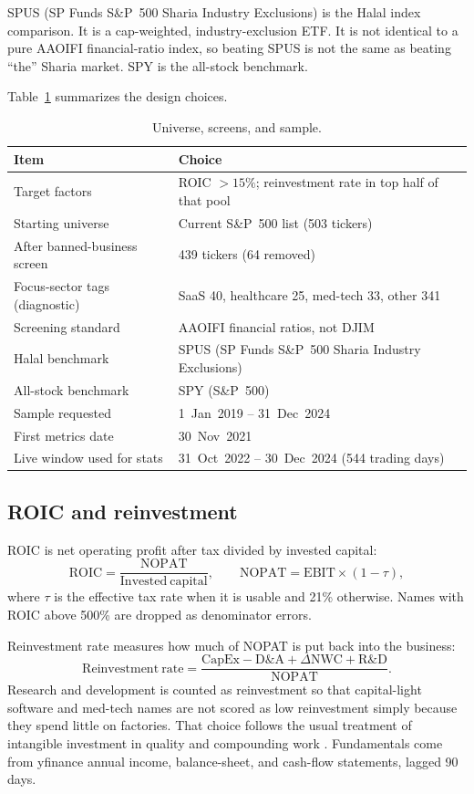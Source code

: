\documentclass[11pt,letterpaper]{article}
\begin{document}
SPUS (SP Funds S\&P~500 Sharia Industry Exclusions) is the Halal index comparison. It is a cap-weighted, industry-exclusion ETF. It is not identical to a pure AAOIFI financial-ratio index, so beating SPUS is not the same as beating ``the'' Sharia market. SPY is the all-stock benchmark.

Table~\ref{tab:universe} summarizes the design choices.

\begin{table}[htbp]
\centering
\caption{Universe, screens, and sample.}
\label{tab:universe}
\begin{tabular}{ll}
\toprule
Item & Choice \\
\midrule
Target factors & ROIC $> 15\%$; reinvestment rate in top half of that pool \\
Starting universe & Current S\&P~500 list (503 tickers) \\
After banned-business screen & 439 tickers (64 removed) \\
Focus-sector tags (diagnostic) & SaaS 40, healthcare 25, med-tech 33, other 341 \\
Screening standard & AAOIFI financial ratios, not DJIM \\
Halal benchmark & SPUS (SP Funds S\&P~500 Sharia Industry Exclusions) \\
All-stock benchmark & SPY (S\&P~500) \\
Sample requested & 1~Jan~2019 -- 31~Dec~2024 \\
First metrics date & 30~Nov~2021 \\
Live window used for stats & 31~Oct~2022 -- 30~Dec~2024 (544 trading days) \\
\bottomrule
\end{tabular}
\end{table}

\subsection{ROIC and reinvestment}

ROIC is net operating profit after tax divided by invested capital:
\[
\mathrm{ROIC} = \frac{\mathrm{NOPAT}}{\mathrm{Invested\ capital}},
\qquad
\mathrm{NOPAT} = \mathrm{EBIT} \times (1 - \tau),
\]
where $\tau$ is the effective tax rate when it is usable and 21\% otherwise. Names with ROIC above 500\% are dropped as denominator errors.

Reinvestment rate measures how much of NOPAT is put back into the business:
\[
\mathrm{Reinvestment\ rate}
= \frac{\mathrm{CapEx} - \mathrm{D\&A} + \Delta\mathrm{NWC} + \mathrm{R\&D}}{\mathrm{NOPAT}}.
\]
Research and development is counted as reinvestment so that capital-light software and med-tech names are not scored as low reinvestment simply because they spend little on factories. That choice follows the usual treatment of intangible investment in quality and compounding work \citep{damodaran2007,peters2017}. Fundamentals come from yfinance annual income, balance-sheet, and cash-flow statements, lagged 90 days.
\end{document}
